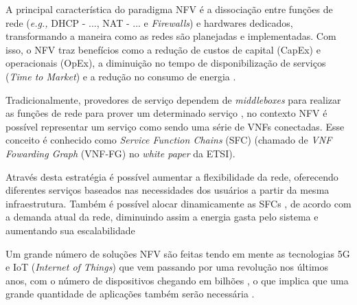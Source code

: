 
A principal característica do paradigma NFV é a dissociação entre funções de rede (\textit{e.g.,} DHCP - ..., NAT - ... e \textit{Firewalls}) e hardwares dedicados, transformando a maneira como as redes são planejadas e implementadas. Com isso, o NFV traz benefícios como a redução de custos de capital (CapEx) e operacionais (OpEx), a diminuição no tempo de disponibilização de serviços (\textit{Time to Market}) e a redução no consumo de energia \citep{Mijumbi2016, Tipantuna2017, Hawilo2014}.

Tradicionalmente, provedores de serviço dependem de \textit{middleboxes} para realizar as funções de rede para prover um determinado serviço \cite{10.5555/2228298.2228331}, no contexto NFV é possível representar um serviço como sendo uma série de VNFs conectadas. Esse conceito é conhecido como \textit{Service Function Chains} (SFC) (chamado de \textit{VNF Fowarding Graph} (VNF-FG) no \textit{white paper} da ETSI).  

Através desta estratégia é possível aumentar a flexibilidade da rede, oferecendo diferentes serviços baseados nas necessidades dos usuários a partir da mesma infraestrutura. Também é possível alocar dinamicamente as SFCs \cite{Liu2017}, de acordo com a demanda atual da rede, diminuindo assim a energia gasta pelo sistema e aumentando sua escalabilidade

Um grande número de soluções NFV são feitas tendo em mente as tecnologias 5G e IoT (\textit{Internet of Things}) que vem passando por uma revolução nos últimos anos, com o número de dispositivos chegando em bilhões \cite{Dhanalaxmi2017}, o que implica que uma grande quantidade de aplicações também serão necessária \cite{Yi2018}.


